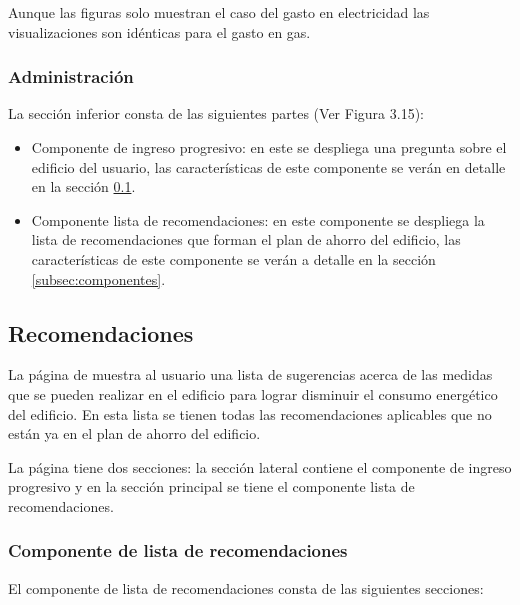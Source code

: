 Aunque las figuras solo muestran el caso del gasto en electricidad las
visualizaciones son idénticas para el gasto en gas.

\subsubsection{Administración}

La sección inferior consta de las siguientes partes (Ver Figura 3.15):
\begin{itemize}
\item Componente de ingreso progresivo: en este se despliega una pregunta
  sobre el edificio del usuario, las características de este componente
  se verán en detalle en la sección \ref{subsec:recomendaciones}.
\item Componente lista de recomendaciones: en este componente se despliega la
  lista de recomendaciones que forman el plan de ahorro del edificio,
  las características de este componente se verán a detalle en la sección
  \ref{subsec:componentes}.
\end{itemize}

\subsection{Recomendaciones}
\label{subsec:recomendaciones}

La página de  muestra al usuario una lista de
sugerencias acerca de las medidas que se pueden realizar en el edificio
para lograr disminuir el consumo energético del edificio. En esta lista se
tienen todas las recomendaciones aplicables que no están ya en el plan
de ahorro del edificio.

La página tiene dos secciones: la sección lateral contiene el componente de
ingreso progresivo y en la sección principal se tiene el componente lista
de recomendaciones.

\subsubsection{Componente de lista de recomendaciones}

El componente de lista de recomendaciones consta de las siguientes secciones:

